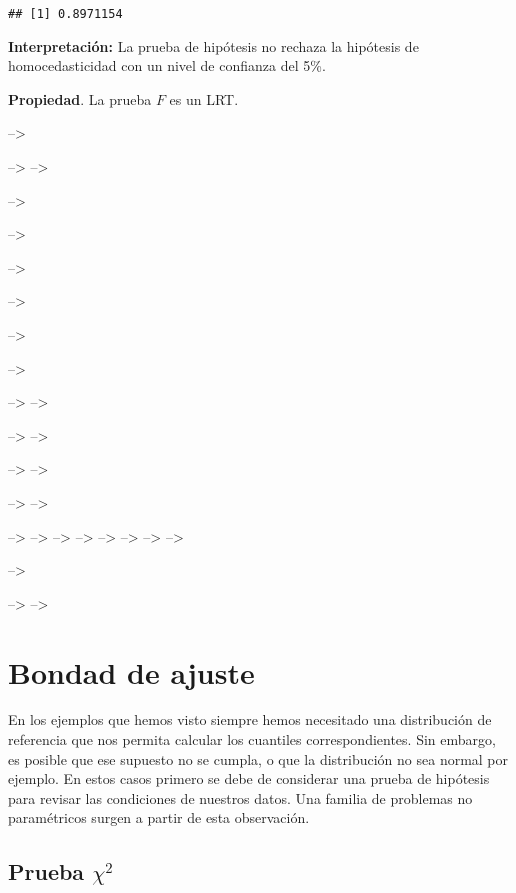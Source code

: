 \documentclass[
  12pt,
]{book}
\begin{document}
\begin{verbatim}
## [1] 0.8971154
\end{verbatim}

\textbf{Interpretación:} La prueba de hipótesis no rechaza la hipótesis de
homocedasticidad con un nivel de confianza del 5\%.

\textbf{Propiedad}. La prueba \(F\) es un LRT.

--\textgreater{}

--\textgreater{}
--\textgreater{}

--\textgreater{}

--\textgreater{}

--\textgreater{}

--\textgreater{}

--\textgreater{}

--\textgreater{}

--\textgreater{}
--\textgreater{}

--\textgreater{}
--\textgreater{}

--\textgreater{}
--\textgreater{}

--\textgreater{}
--\textgreater{}

--\textgreater{}
--\textgreater{}
--\textgreater{}
--\textgreater{}
--\textgreater{}
--\textgreater{}
--\textgreater{}
--\textgreater{}

--\textgreater{}

--\textgreater{}
--\textgreater{}

\hypertarget{bondad-de-ajuste}{%
\chapter{Bondad de ajuste}\label{bondad-de-ajuste}}

En los ejemplos que hemos visto siempre hemos necesitado una distribución de
referencia que nos permita calcular los cuantiles correspondientes. Sin embargo,
es posible que ese supuesto no se cumpla, o que la distribución no sea normal
por ejemplo. En estos casos primero se debe de considerar una prueba de
hipótesis para revisar las condiciones de nuestros datos. Una familia de
problemas no paramétricos surgen a partir de esta observación.

\hypertarget{prueba-chi2}{%
\section{\texorpdfstring{Prueba \(\chi^2\)}{Prueba \textbackslash chi\^{}2}}\label{prueba-chi2}}
\end{document}
